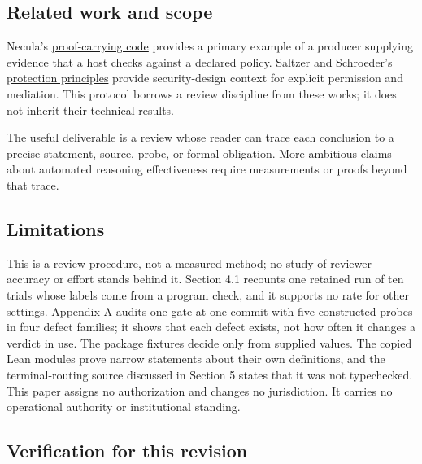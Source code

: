 \documentclass[
  11pt,
]{article}
\begin{document}
\hypertarget{related-work-and-scope}{%
\subsection{Related work and scope}\label{related-work-and-scope}}

Necula's \href{https://doi.org/10.1145/263699.263712}{proof-carrying
code} provides a primary example of a producer supplying evidence that a
host checks against a declared policy. Saltzer and Schroeder's
\href{https://doi.org/10.1109/PROC.1975.9939}{protection principles}
provide security-design context for explicit permission and mediation.
This protocol borrows a review discipline from these works; it does not
inherit their technical results.

The useful deliverable is a review whose reader can trace each
conclusion to a precise statement, source, probe, or formal obligation.
More ambitious claims about automated reasoning effectiveness require
measurements or proofs beyond that trace.

\hypertarget{limitations}{%
\subsection{Limitations}\label{limitations}}

This is a review procedure, not a measured method; no study of reviewer
accuracy or effort stands behind it. Section 4.1 recounts one retained
run of ten trials whose labels come from a program check, and it
supports no rate for other settings. Appendix A audits one gate at one
commit with five constructed probes in four defect families; it shows
that each defect exists, not how often it changes a verdict in use. The
package fixtures decide only from supplied values. The copied Lean
modules prove narrow statements about their own definitions, and the
terminal-routing source discussed in Section 5 states that it was not
typechecked. This paper assigns no authorization and changes no
jurisdiction. It carries no operational authority or institutional
standing.

\hypertarget{verification-for-this-revision}{%
\subsection{Verification for this
revision}\label{verification-for-this-revision}}
\end{document}
